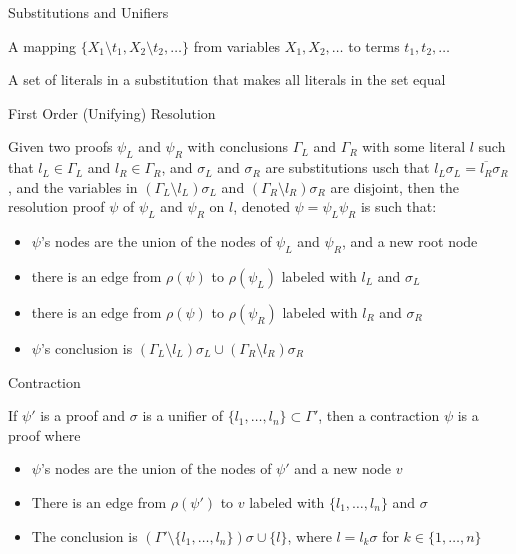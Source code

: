 \documentclass{beamer}
\begin{document}
\begin{frame}{Substitutions and Unifiers}
\begin{definition}[Substitution]
A mapping $\{X_1\setminus t_1, X_2\setminus t_2,\ldots\}$ from variables $X_1,X_2,\ldots$ to terms $t_1,t_2,\ldots$
\end{definition}


\begin{definition}[Unifier]
A set of literals in a substitution that makes all literals in the set equal
\end{definition}

\end{frame}

\begin{frame}{First Order (Unifying) Resolution}
\begin{definition}
Given two proofs $\psi_L$ and $\psi_R$ with conclusions $\Gamma_L$ and $\Gamma_R$ with some literal $l$ such that $l_L\in \Gamma_L$ and $l_R\in \Gamma_R$, and $\sigma_L$ and $\sigma_R$ are substitutions usch that $l_L\sigma_L=\overline{l_R}\sigma_R$, and the variables in $(\Gamma_L\setminus l_L)\sigma_L$ and $(\Gamma_R\setminus l_R)\sigma_R$ are disjoint, then the resolution proof $\psi$ of $\psi_L$ and $\psi_R$ on $l$, denoted $\psi=\psi_L \psi_R$ is such that:
\begin{itemize}
\item $\psi$'s nodes are the union of the nodes of $\psi_L$ and $\psi_R$, and a new root node
\item there is an edge from $\rho(\psi)$ to $\rho(\psi_L)$ labeled with $l_L$ and $\sigma_L$
\item there is an edge from $\rho(\psi)$ to $\rho(\psi_R)$ labeled with $l_R$ and $\sigma_R$
\item $\psi$'s conclusion is $(\Gamma_L\setminus l_L)\sigma_L\cup (\Gamma_R\setminus l_R)\sigma_R$
\end{itemize}
\end{definition}
\end{frame}

\begin{frame}{Contraction}
\begin{definition}[Contraction]
If $\psi'$ is a proof and $\sigma$ is a unifier of $\{l_1,\ldots,l_n\}\subset \Gamma'$, then a contraction $\psi$ is a proof where
\begin{itemize}
\item $\psi$'s nodes are the union of the nodes of $\psi'$ and a new node $v$
\item There is an edge from $\rho(\psi')$ to $v$ labeled with $\{l_1,\ldots,l_n\}$ and $\sigma$
\item The conclusion is $(\Gamma'\setminus \{l_1,\ldots,l_n\})\sigma \cup \{l\}$, where $l=l_k\sigma$ for $k\in \{1,\ldots,n\}$
\end{itemize}
\end{definition}
\end{frame}
\end{document}
